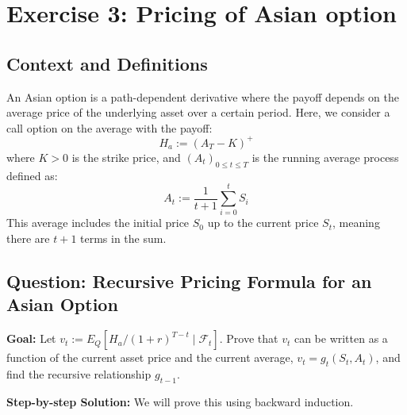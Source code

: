 \section*{Exercise 3: Pricing of Asian option}

\subsection*{Context and Definitions}
An Asian option is a path-dependent derivative where the payoff depends on the average price of the underlying asset over a certain period. 
Here, we consider a call option on the average with the payoff:
\begin{equation*}
    H_a := (A_T - K)^+
\end{equation*}
where $K > 0$ is the strike price, and $(A_t)_{0 \le t \le T}$ is the running average process defined as:
\begin{equation*}
    A_t := \frac{1}{t+1} \sum_{i=0}^t S_i
\end{equation*}
This average includes the initial price $S_0$ up to the current price $S_t$, meaning there are $t+1$ terms in the sum.

\subsection*{Question: Recursive Pricing Formula for an Asian Option}
\textbf{Goal:} Let $v_t := E_Q[H_a / (1+r)^{T-t} \mid \mathcal{F}_t]$. Prove that $v_t$ can be written as a function of the current asset price and the current average, $v_t = g_t(S_t, A_t)$, and find the recursive relationship $g_{t-1}$.

\vspace{0.5cm}
\noindent \textbf{Step-by-step Solution:}
We will prove this using backward induction.

